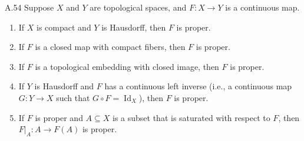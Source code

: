 \begin{exercise}{A.54}
    Suppose \(X\) and \(Y\) are topological spaces, and \(F : X \to Y\) is a continuous map.

    \begin{enumerate}[itemsep=0pt,label={(\alph*)}]
        \item If \(X\) is compact and \(Y\) is Hausdorff, then \(F\) is proper.

        \item If \(F\) is a closed map with compact fibers, then \(F\) is proper.

        \item If \(F\) is a topological embedding with closed image, then \(F\) is proper.

        \item If \(Y\) is Hausdorff and \(F\) has a continuous left inverse (i.e., a continuous map \(G : Y \to X\) such that \(G \circ F = \operatorname{Id}_{X}\)), then \(F\) is proper.

        \item If \(F\) is proper and \(A \subseteq X\) is a subset that is saturated with respect to \(F\), then \(F\vert_{A} : A \to F(A)\) is proper.
    \end{enumerate}
\end{exercise}

